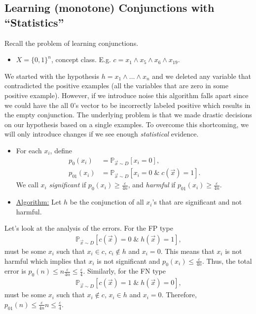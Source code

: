 \documentclass[12pt, letterpaper]{article}
\numberwithin{equation}{section} %
\newcommand{\ul}{\underline}
\newcommand{\mb}{\mathbb}
\newcommand{\ve}{\varepsilon}
\theoremstyle{definition}
\theoremstyle{remark}
\begin{document}
\subsection{Learning (monotone) Conjunctions with ``Statistics''}
Recall the problem of learning conjunctions.
\begin{itemize}
\item $X=\lbrace 0, 1\rbrace^n$, concept class. E.g. $c=x_1\land x_5\land x_6\land x_{19}$.
\end{itemize}
We started with the hypothesis $h=x_1\land\ldots\land x_n$ and we deleted any variable that contradicted the positive examples (all the variables that are zero in some positive example). However, if we introduce noise this algorithm falls apart since we could have the all 0's vector to be incorrectly labeled positive which results in the empty conjunction. The underlying problem is that we made drastic decisions on our hypothesis based on a single examples. To overcome this shortcoming, we will only introduce changes if we see enough \emph{statistical} evidence.
\begin{itemize}
\item For each $x_i$, define
\begin{align}
p_0(x_i) &= \mb P_{\vec x\sim D}[x_i=0],\\
p_{01}(x_i) &= \mb P_{\vec x\sim D}[x_i=0 \;\&\; c(\vec x) = 1].
\end{align}
We call $x_i$ \emph{significant} if $p_0(x_i) \geq \frac\ve{4n}$, and \emph{harmful} if $p_{01}(x_i) \geq \frac\ve{4n}$.

\item \ul{Algorithm:} Let $h$ be the conjunction of all $x_i$'s that are significant and not harmful.
\end{itemize}
Let's look at the analysis of the errors. For the FP type
\begin{align}
\mb P_{\vec x \sim D}[c(\vec x)=0 \;\&\; h(\vec x)=1],
\end{align}
must be some $x_i$ such that $x_i \in c$, $c_i\not \in h$ and $x_i=0$. This means that $x_i$ is not harmful which implies that $x_i$ is not significant and $p_0(x_i)\leq \frac\ve{4n}$. Thus, the total error  is $p_0(n)\leq n \frac\ve{4n} \leq \frac\ve4$. Similarly, for the FN type
\begin{align}
\mb P_{\vec x \sim D}[c(\vec x)=1 \;\&\; h(\vec x)=0],
\end{align}
must be some $x_i$ such that $x_i\not\in c$, $x_i\in h$ and $x_i=0$. Therefore, $p_{01}(n) \leq \frac\ve{4n} n \leq \frac\ve4$.
\end{document}
